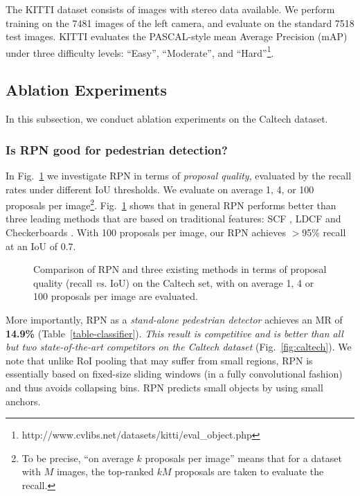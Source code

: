 \documentclass[runningheads]{llncs}
\def\vs{\emph{vs. }}
\begin{document}
The KITTI dataset \cite{geiger2012kitti} consists of images with stereo data available. We perform training on the 7481 images of the left camera, and evaluate on the standard 7518 test images. 
KITTI evaluates the PASCAL-style mean Average Precision (mAP) under three difficulty levels: ``Easy'', ``Moderate'', and ``Hard''\footnote{http://www.cvlibs.net/datasets/kitti/eval\_object.php}.

\subsection{Ablation Experiments}

In this subsection, we conduct ablation experiments on the Caltech dataset.

\subsubsection{Is RPN good for pedestrian detection?}\hfill

In Fig.~\ref{fig:proposal} we investigate RPN in terms of \emph{proposal quality}, evaluated by the recall rates under different IoU thresholds. We evaluate on average 1, 4, or 100 proposals per image\footnote{To be precise, ``on average $k$ proposals per image'' means that for a dataset with $M$ images, the top-ranked $kM$ proposals are taken to evaluate the recall.}. Fig.~\ref{fig:proposal} shows that in general RPN performs better than three leading methods that are based on traditional features: SCF \cite{benenson2014ten}, LDCF \cite{nam2014local} and Checkerboards \cite{zhang2015filtered}.
With 100 proposals per image, our RPN achieves $>$95\% recall at an IoU of 0.7.

\begin{figure}[t] \centering
{}
\caption{Comparison of RPN and three existing methods in terms of proposal quality (recall \vs IoU) on the Caltech set, with on average 1, 4 or 100 proposals per image are evaluated.}
\label{fig:proposal}
\end{figure}

More importantly, RPN as a \emph{stand-alone pedestrian detector} achieves an MR of \textbf{14.9\%} (Table~\ref{table-classifier}). \emph{This result is competitive and is better than all but two state-of-the-art competitors on the Caltech dataset} (Fig.~\ref{fig:caltech}). We note that unlike RoI pooling that may suffer from small regions, RPN is essentially based on fixed-size sliding windows (in a fully convolutional fashion) and thus avoids collapsing bins. RPN predicts small objects by using small anchors.
\end{document}
